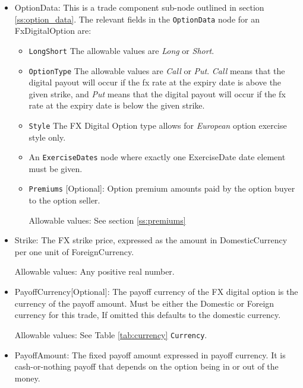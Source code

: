 \begin{itemize}

\item OptionData: This is a trade component sub-node outlined in section \ref{ss:option_data}. 
The relevant fields in the \lstinline!OptionData! node for an FxDigitalOption are:

\begin{itemize}
\item \lstinline!LongShort! The allowable values are \emph{Long} or \emph{Short}.

\item \lstinline!OptionType! The allowable values are \emph{Call} or \emph{Put}. \emph{Call} means that the digital payout will occur if the fx rate at the expiry date is above the given strike, and \emph{Put} means that the digital payout will occur if the fx rate at the expiry date is below the given strike.

\item  \lstinline!Style! The FX Digital Option type allows for \emph{European} option exercise style only.


\item An \lstinline!ExerciseDates! node where exactly one ExerciseDate date element must be given.

\item \lstinline!Premiums! [Optional]: Option premium amounts paid by the option buyer to the option seller.

Allowable values:  See section \ref{ss:premiums}

\end{itemize}

\item Strike: The FX strike price, expressed as the amount in DomesticCurrency per one unit of ForeignCurrency. 

Allowable values:  Any positive real number.

\item PayoffCurrency[Optional]: The payoff currency of the FX digital option is the currency of the payoff amount. Must be either the Domestic or Foreign currency for this trade, If omitted this defaults to the domestic currency.

Allowable values:  See Table \ref{tab:currency} \lstinline!Currency!.

\item PayoffAmount: The fixed payoff amount expressed in payoff currency. It is cash-or-nothing payoff that depends on the option being in or out of the money.


\end{itemize}
